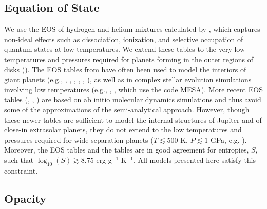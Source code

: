 
\subsection{Equation of State}
\label{sec:introeos}

We use the EOS of hydrogen and helium mixtures calculated by \citet{saumon95}, which captures non-ideal effects such as dissociation, ionization, and selective occupation of quantum states at low temperatures.  We extend these tables to the very low temperatures and pressures required for planets forming in the outer regions of disks ().
The EOS tables from \citet{saumon95} have often been used to model the interiors of giant planets (e.g., \citealt{pollack96}, \citealt{ikoma00}, \citealt{alibert05}, \citealt{hubickyj05}, \citealt{pn05}, \citealt{mordasini12}), as well as in complex stellar evolution simulations involving low temperatures (e.g., \citealt{paxton11}, \citealt{paxton13}, which use the code MESA). More recent EOS tables (\citealt{nettelmann08}, \citealt{nettelmann12}, \citealt{militzer13}) are based on ab initio molecular dynamics simulations and thus avoid some of the approximations of the \citet{saumon95} semi-analytical approach. However, though these newer tables are sufficient to model the internal structures of Jupiter and of close-in extrasolar planets,  they do not extend to the low temperatures and pressures required for wide-separation planets ($T \lesssim 500$ K, $P \lesssim 1$ GPa, e.g. \citealt{militzer13}). Moreover, the \citet{militzer13} EOS tables and the \citet{saumon95} tables are in good agreement for entropies, $S$, such that $\log_{10}(S) \gtrsim 8.75$ erg g$^{-1}$ K$^{-1}$.  All models presented here satisfy this constraint. 

\subsection{Opacity}
\label{sec:introopacity}


